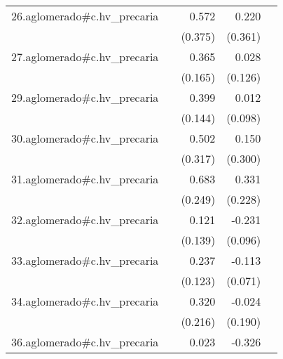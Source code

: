 {\begin{longtable}{l*{4}{D{.}{.}{-1}}}
\addlinespace
26.aglomerado#c.hv\_precaria&                     &       0.572         &       0.220         &                     \\
            &                     &     (0.375)         &     (0.361)         &                     \\
\addlinespace
27.aglomerado#c.hv\_precaria&                     &       0.365\sym{*}  &       0.028         &                     \\
            &                     &     (0.165)         &     (0.126)         &                     \\
\addlinespace
29.aglomerado#c.hv\_precaria&                     &       0.399\sym{**} &       0.012         &                     \\
            &                     &     (0.144)         &     (0.098)         &                     \\
\addlinespace
30.aglomerado#c.hv\_precaria&                     &       0.502         &       0.150         &                     \\
            &                     &     (0.317)         &     (0.300)         &                     \\
\addlinespace
31.aglomerado#c.hv\_precaria&                     &       0.683\sym{**} &       0.331         &                     \\
            &                     &     (0.249)         &     (0.228)         &                     \\
\addlinespace
32.aglomerado#c.hv\_precaria&                     &       0.121         &      -0.231\sym{*}  &                     \\
            &                     &     (0.139)         &     (0.096)         &                     \\
\addlinespace
33.aglomerado#c.hv\_precaria&                     &       0.237         &      -0.113         &                     \\
            &                     &     (0.123)         &     (0.071)         &                     \\
\addlinespace
34.aglomerado#c.hv\_precaria&                     &       0.320         &      -0.024         &                     \\
            &                     &     (0.216)         &     (0.190)         &                     \\
\addlinespace
36.aglomerado#c.hv\_precaria&                     &       0.023         &      -0.326         &                     \\

\end{longtable}}
